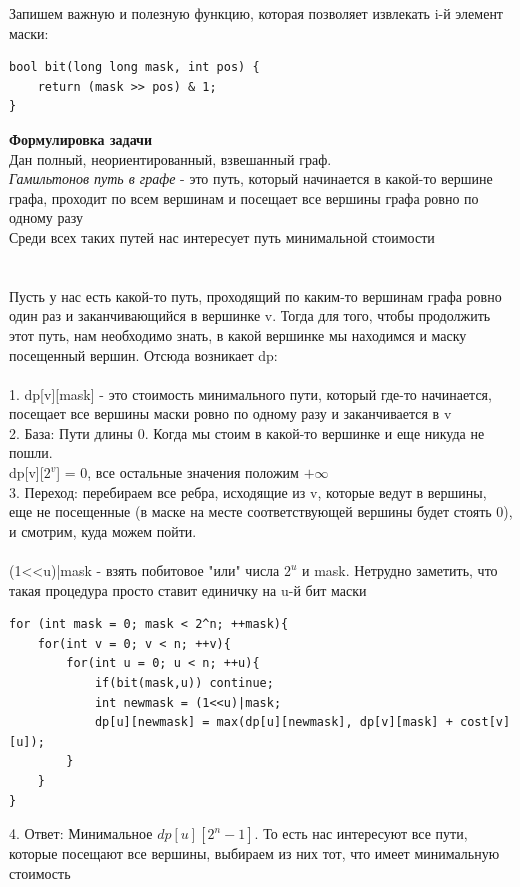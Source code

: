 Запишем важную и полезную функцию, которая позволяет извлекать i-й элемент маски:
\begin{lstlisting}
bool bit(long long mask, int pos) {
	return (mask >> pos) & 1;
}
\end{lstlisting}
\textbf{Формулировка задачи} \\ Дан полный, неориентированный, взвешанный граф.
\\
\textit{Гамильтонов путь в графе} - это путь, который начинается в какой-то вершине графа, проходит по всем вершинам и посещает все вершины графа ровно по одному разу
\\
Среди всех таких путей нас интересует путь минимальной стоимости
\\
\\
\\
Пусть у нас есть какой-то путь, проходящий по каким-то вершинам графа ровно один раз и заканчивающийся в вершинке v. Тогда для того, чтобы продолжить этот путь, нам необходимо знать, в какой вершинке мы находимся и маску посещенный вершин. Отсюда возникает dp:
\\
\\
1. dp[v][mask] - это стоимость минимального пути, который где-то начинается, посещает все вершины маски ровно по одному разу и заканчивается в v\\
2. База: Пути длины 0. Когда мы стоим в какой-то вершинке и еще никуда не пошли. \\ dp[v][$2^v$] = 0, все остальные значения положим $+\infty$ \\
3. Переход: перебираем все ребра, исходящие из v, которые ведут в вершины, еще не посещенные (в маске на месте соответствующей вершины будет стоять 0), и смотрим, куда можем пойти. 
\\
\\
 (1<<u)|mask - взять побитовое "или" числа $2^u$ и mask. Нетрудно заметить, что такая процедура просто ставит единичку на u-й бит маски
\begin{lstlisting}
for (int mask = 0; mask < 2^n; ++mask){
    for(int v = 0; v < n; ++v){
        for(int u = 0; u < n; ++u){
            if(bit(mask,u)) continue;
            int newmask = (1<<u)|mask;
            dp[u][newmask] = max(dp[u][newmask], dp[v][mask] + cost[v][u]);
        }
    }
}
\end{lstlisting}
4. Ответ: Минимальное $dp[u][2^n - 1]$. То есть нас интересуют все пути, которые посещают все вершины, выбираем из них тот, что имеет минимальную стоимость
\\

